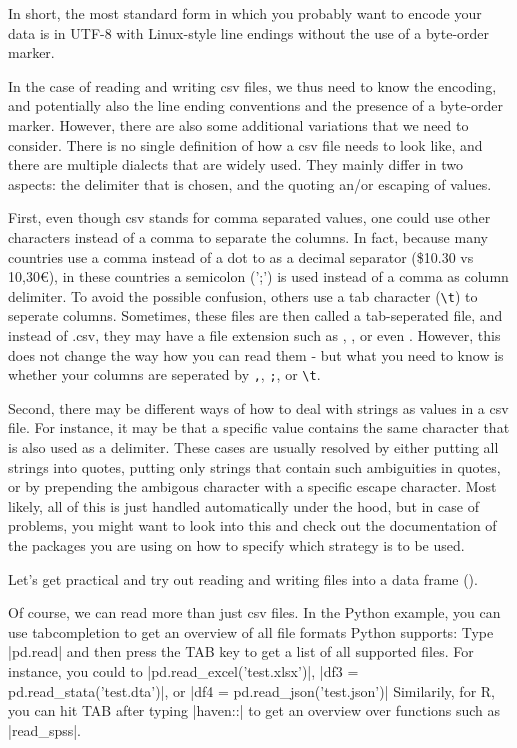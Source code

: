 In short, the most standard form in which you probably want to encode your data is in UTF-8 with Linux-style line endings without the use of a byte-order marker.


In the case of reading and writing csv files, we thus need to know the encoding, and potentially also the line ending conventions and the presence of a byte-order marker. However, there are also some additional variations that we need to consider. There is no single definition of how a csv file needs to look like, and there are multiple dialects that are widely used. They mainly differ in two aspects: the delimiter that is chosen, and the quoting an/or escaping of values.

First, even though csv stands for comma separated values, one could use other characters instead of a comma to separate the columns. In fact, because many countries use a comma instead of a dot to as a decimal separator (\$10.30 vs 10,30€), in these countries a semicolon (';') is used instead of a comma as  column delimiter. To avoid the possible confusion, others use a tab character (\texttt{\textbackslash t}) to seperate columns. Sometimes, these files are then called a tab-seperated file, and instead of .csv, they may have a file extension such as , , or even . However, this does not change the way how you can read them - but what you need to know is whether your columns are seperated by \texttt{,}, \texttt{;}, or \texttt{\textbackslash t}. 

Second, there may be different ways of how to deal with strings as values in a csv file. For instance, it may be that a specific value contains the same character that is also used as a delimiter. These cases are usually resolved by either putting all strings into quotes, putting only strings that contain such ambiguities in quotes, or by prepending the ambigous character with a specific escape character. Most likely, all of this is just handled automatically under the hood, but in case of problems, you might want to look into this and check out the documentation of the packages you are using on how to specify which strategy is to be used.

Let's get practical and try out reading and writing files into a data frame ().


Of course, we can read more than just csv files. In the Python
example, you can use tabcompletion to get an overview of all file
formats Python supports: Type |pd.read| and then press the TAB key to
get a list of all supported files. For instance, you could to
|pd.read_excel('test.xlsx')|, |df3 = pd.read_stata('test.dta')|, or
|df4 = pd.read_json('test.json')| Similarily, for R, you can hit TAB
after typing |haven::| to get an overview over functions such as
|read_spss|.

